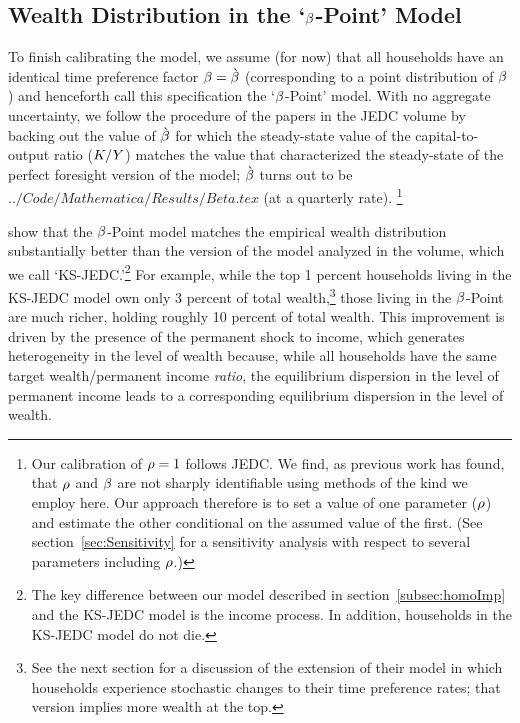 \documentclass[12pt,titlepage]{econtex}
\begin{document}
\subsection{Wealth Distribution in the `$\beta$-Point' Model}
To finish calibrating the model, we assume (for now) that all households have an identical
time preference factor $\beta =\grave{\beta}$ (corresponding to a point distribution
of $\beta$) and henceforth call this specification the `$\beta$-Point' model.
With no aggregate uncertainty, we follow the procedure of the papers in the JEDC volume by backing out the value of $\grave{\beta}$ for which the steady-state value of the capital-to-output ratio ($K/Y$) matches the value
that characterized the steady-state of the perfect foresight version of the model; $\grave{\beta}$ turns out to be $ 
../Code/Mathematica/Results/Beta.tex $ (at a quarterly rate).%
\footnote{%
Our calibration of $\rho=1$ follows JEDC. We find, as previous work has found, that $\rho$ and $\beta$ are not sharply identifiable using methods of the kind we employ here.  Our approach therefore is to set a value of one parameter ($\rho$) and estimate the other conditional on the assumed value of the first. (See section~\ref{sec:Sensitivity} for a sensitivity analysis with respect to several parameters including $\rho$.)
}

\citet{cstKS} show that the $\beta$-Point model matches the empirical wealth distribution
substantially better than the version of the \citet{ksHetero} model analyzed in the \citet{jedc_ksVolume} volume, which we call `KS-JEDC.'\footnote{The key difference between our model described in section~\ref{subsec:homoImp} and the KS-JEDC model is
 the income process. In addition, households in the KS-JEDC model do not die. }  For example, while the top 1 percent households living in the KS-JEDC model own only 3 percent
of total wealth,\footnote{See the next section for a discussion of the extension of their model in which households experience stochastic changes to their time preference rates; that version implies more wealth at the top.} those living in the $\beta$-Point are much richer, holding roughly 10
percent of total wealth.  This improvement is driven by the presence of the permanent shock to income,
which generates heterogeneity in the level of wealth because, while all households have the same
target wealth/permanent income {\it ratio}, the equilibrium dispersion in the level of permanent
income leads to a corresponding equilibrium dispersion in the level of wealth.
\end{document}
